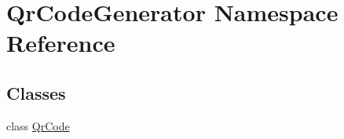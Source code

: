 \hypertarget{namespace_qr_code_generator}{}\section{Qr\+Code\+Generator Namespace Reference}
\label{namespace_qr_code_generator}
\subsection*{Classes}
\begin{DoxyCompactItemize}
\item 
class \mbox{\hyperlink{class_qr_code_generator_1_1_qr_code}{Qr\+Code}}
\end{DoxyCompactItemize}
